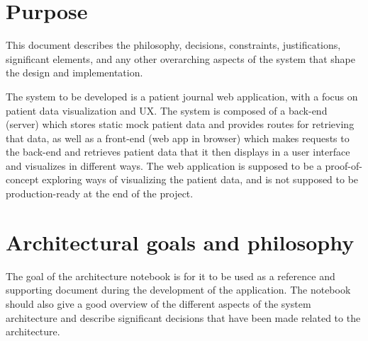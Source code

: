 \documentclass[10pt,a4paper]{article}
\begin{document}
\setcounter{tocdepth}{2}
\tableofcontents

\clearpage



\section{Purpose}


This document describes the philosophy, decisions, constraints, justifications, significant elements, and any other overarching aspects of the system that shape the design and implementation. 

The system to be developed is a patient journal web application, with a focus on patient data visualization and UX. The system is composed of a back-end (server) which stores static mock patient data and provides routes for retrieving that data, as well as a front-end (web app in browser) which makes requests to the back-end and retrieves patient data that it then displays in a user interface and visualizes in different ways. The web application is supposed to be a proof-of-concept exploring ways of visualizing the patient data, and is not supposed to be production-ready at the end of the project.

\section{Architectural goals and philosophy}
The goal of the architecture notebook is for it to be used as a reference and supporting document during the development of the application. The notebook should also give a good overview of the different aspects of the system architecture and describe significant decisions that have been made related to the architecture. 
\end{document}
